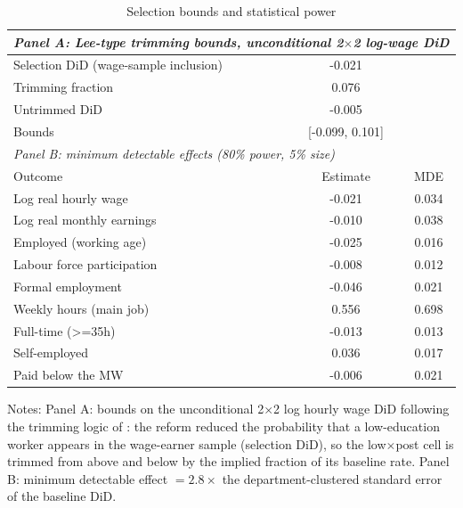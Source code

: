 \begin{table}[!tbp]\centering
\caption{Selection bounds and statistical power}\label{tab:leemde}
\begin{threeparttable}
\footnotesize
\begin{tabular}{lcc}
\toprule
\multicolumn{3}{l}{\emph{Panel A: Lee-type trimming bounds, unconditional 2$\times$2 log-wage DiD}}\\
\midrule
Selection DiD (wage-sample inclusion) & -0.021 & \\
Trimming fraction & 0.076 & \\
Untrimmed DiD & -0.005 & \\
Bounds & [-0.099, 0.101] & \\
\midrule
\multicolumn{3}{l}{\emph{Panel B: minimum detectable effects (80\% power, 5\% size)}}\\
Outcome & Estimate & MDE \\ \midrule
Log real hourly wage & -0.021 & 0.034 \\
Log real monthly earnings & -0.010 & 0.038 \\
Employed (working age) & -0.025 & 0.016 \\
Labour force participation & -0.008 & 0.012 \\
Formal employment & -0.046 & 0.021 \\
Weekly hours (main job) & 0.556 & 0.698 \\
Full-time (>=35h) & -0.013 & 0.013 \\
Self-employed & 0.036 & 0.017 \\
Paid below the MW & -0.006 & 0.021 \\
\bottomrule
\end{tabular}
\begin{tablenotes}\footnotesize
\item Notes: Panel A: bounds on the unconditional 2$\times$2 log hourly wage DiD following the trimming logic of \citet{lee_2009}: the reform reduced the probability that a low-education worker appears in the wage-earner sample (selection DiD), so the low$\times$post cell is trimmed from above and below by the implied fraction of its baseline rate. Panel B: minimum detectable effect $=2.8\times$ the department-clustered standard error of the baseline DiD.
\end{tablenotes}
\end{threeparttable}\end{table}
